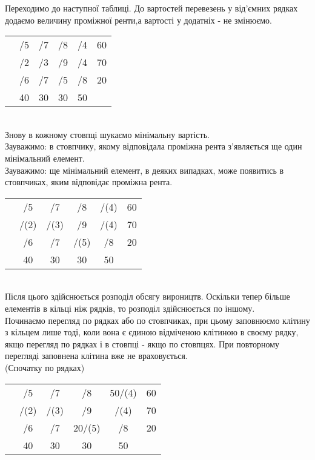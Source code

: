 \documentclass[12pt]{book}
\begin{document}
Переходимо до наступної таблиці. До вартостей перевезень у від’ємних рядках додаємо величину проміжної ренти,а вартості у додатніх - не змінюємо.\\
\begin{tabular}{ | c | c | c | c | c | c | }
\hline
	&		&		&		&		&\\
\hline
	&	/5	&	/7	&	/8	&	/4	&	60\\
\hline
	&	/2	&	/3	&	/9	&	/4	&	70\\
\hline
	&	/6	&	/7	&	/5	&	/8	&	20\\
\hline
	&	40	&	30	&	30	&	50	&\\
\hline
\end{tabular}\\
Знову в кожному стовпці шукаємо мінімальну вартість.\\
Зауважимо: в стовпчику, якому відповідала проміжна рента з’являється ще один мінімальний елемент.\\
Зауважимо: ще мінімальний елемент, в деяких випадках, може появитись в стовпчиках, яким відповідає проміжна рента.\\
\begin{tabular}{ | c | c | c | c | c | c | }
\hline
	&		&		&		&		&\\
\hline
	&	/5	&	/7	&	/8	&	/(4)	&	60\\
\hline
	&	/(2)	&	/(3)	&	/9	&	/(4)	&	70\\
\hline
	&	/6	&	/7	&	/(5)	&	/8	&	20\\
\hline
	&	40	&	30	&	30	&	50	&\\
\hline
\end{tabular}\\
Після цього здійснюється розподіл обсягу вироництв. Оскільки тепер більше елементів в кільці ніж рядків, то розподіл здійснюється по іншому.\\
Починаємо перегляд по рядках або по стовпчиках, при цьому заповнюємо клітину з кільцем лише тоді, коли вона є єдиною відміченою клітиною в своєму рядку, якщо перегляд по рядках і в стовпці - якщо по стовпцях. При повторному перегляді заповнена клітина вже не враховується. \\
(Спочатку по рядках)
\begin{tabular}{ | c | c | c | c | c | c | }
\hline
	&		&		&		&		&\\
\hline
	&	/5	&	/7	&	/8	&	50/(4)	&	60\\
\hline
	&	/(2)	&	/(3)	&	/9	&	/(4)	&	70\\
\hline
	&	/6	&	/7	&	20/(5)	&	/8	&	20\\
\hline
	&	40	&	30	&	30	&	50	&\\
\hline
\end{tabular}\\
\end{document}

